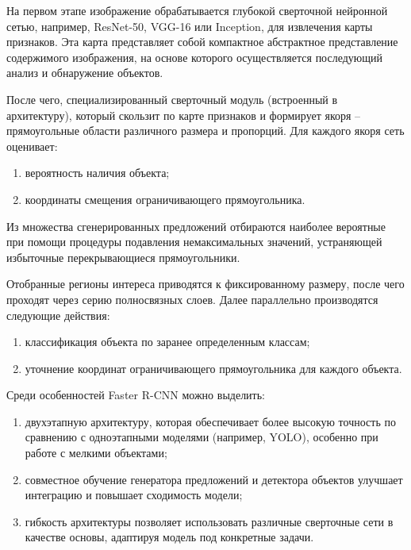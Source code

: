 На первом этапе изображение обрабатывается глубокой сверточной нейронной сетью, 
например, ResNet-50, VGG-16 или Inception, для извлечения карты признаков. Эта 
карта представляет собой компактное абстрактное представление содержимого 
изображения, на основе которого осуществляется последующий анализ и обнаружение 
объектов.

После чего, специализированный сверточный модуль (встроенный в архитектуру), 
который скользит по карте признаков и формирует якоря -- прямоугольные области 
различного размера и пропорций. Для каждого якоря сеть оценивает:

\begin{enumerate}
    \item вероятность наличия объекта;
    \item координаты смещения ограничивающего прямоугольника.
\end{enumerate}

Из множества сгенерированных предложений отбираются наиболее вероятные при помощи 
процедуры подавления немаксимальных значений, устраняющей избыточные 
перекрывающиеся прямоугольники.

Отобранные регионы интереса приводятся к фиксированному размеру, после чего 
проходят через серию полносвязных слоев. Далее параллельно производятся 
следующие действия:

\begin{enumerate}
    \item классификация объекта по заранее определенным классам;
    \item уточнение координат ограничивающего прямоугольника для каждого объекта.
\end{enumerate}

Среди особенностей Faster R-CNN можно выделить:

\begin{enumerate}
    \item двухэтапную архитектуру, которая обеспечивает более высокую точность 
    по сравнению с одноэтапными моделями (например, YOLO), особенно при работе с 
    мелкими объектами;
    \item совместное обучение генератора предложений и детектора объектов 
    улучшает интеграцию и повышает сходимость модели;
    \item гибкость архитектуры позволяет использовать различные сверточные сети в 
    качестве основы, адаптируя модель под конкретные задачи.
\end{enumerate}


